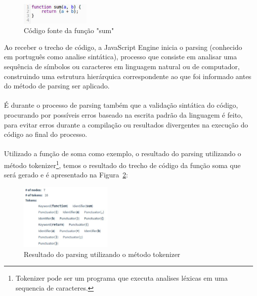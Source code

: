 \documentclass[12pt,a4paper]{article}
\begin{document}
\begin{figure}[h]
	\centering
	\includegraphics[width=0.3\textwidth]{figura2.png}
	\caption{Código fonte da função "sum"}
	\label{fig:figura2}
\end{figure}

Ao receber o trecho de código, a JavaScript Engine inicia o parsing (conhecido em português como analise sintática), processo que consiste em analisar uma sequência de símbolos ou caracteres em linguagem natural ou de computador, construindo uma estrutura hierárquica correspondente ao que foi informado antes do método de parsing ser aplicado. \\
\\
É durante o processo de parsing também que a validação sintática do código, procurando por possíveis erros baseado na escrita padrão da linguagem é feito, para evitar erros durante a compilação ou resultados divergentes na execução do código ao final do processo. \\
\\
Utilizado a função de soma como exemplo, o resultado do parsing utilizando o método tokenizer\footnote{Tokenizer pode ser um programa que executa analises léxicas em uma sequencia de caracteres.}, temos o resultado do trecho de código da função soma que será gerado e é apresentado na Figura~\ref{fig:figura3}: \\

\begin{figure}[h]
	\centering
	\includegraphics[width=0.4\textwidth]{figura3.png}
	\caption{Resultado do parsing utilizando o método tokenizer}
	\label{fig:figura3}
\end{figure}
\end{document}
